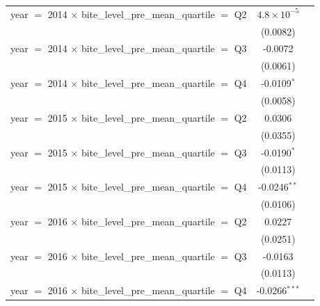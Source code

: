 \begin{tabular}{lcc}
   year $=$ 2014 $\times$ bite\_level\_pre\_mean\_quartile $=$ Q2             & $4.8\times 10^{-5}$      &   \\   
                                                                              & (0.0082)                 &   \\   
   year $=$ 2014 $\times$ bite\_level\_pre\_mean\_quartile $=$ Q3             & -0.0072                  &   \\   
                                                                              & (0.0061)                 &   \\   
   year $=$ 2014 $\times$ bite\_level\_pre\_mean\_quartile $=$ Q4             & -0.0109$^{*}$            &   \\   
                                                                              & (0.0058)                 &   \\   
   year $=$ 2015 $\times$ bite\_level\_pre\_mean\_quartile $=$ Q2             & 0.0306                   &   \\   
                                                                              & (0.0355)                 &   \\   
   year $=$ 2015 $\times$ bite\_level\_pre\_mean\_quartile $=$ Q3             & -0.0190$^{*}$            &   \\   
                                                                              & (0.0113)                 &   \\   
   year $=$ 2015 $\times$ bite\_level\_pre\_mean\_quartile $=$ Q4             & -0.0246$^{**}$           &   \\   
                                                                              & (0.0106)                 &   \\   
   year $=$ 2016 $\times$ bite\_level\_pre\_mean\_quartile $=$ Q2             & 0.0227                   &   \\   
                                                                              & (0.0251)                 &   \\   
   year $=$ 2016 $\times$ bite\_level\_pre\_mean\_quartile $=$ Q3             & -0.0163                  &   \\   
                                                                              & (0.0113)                 &   \\   
   year $=$ 2016 $\times$ bite\_level\_pre\_mean\_quartile $=$ Q4             & -0.0266$^{***}$          &   \\   

\end{tabular}
